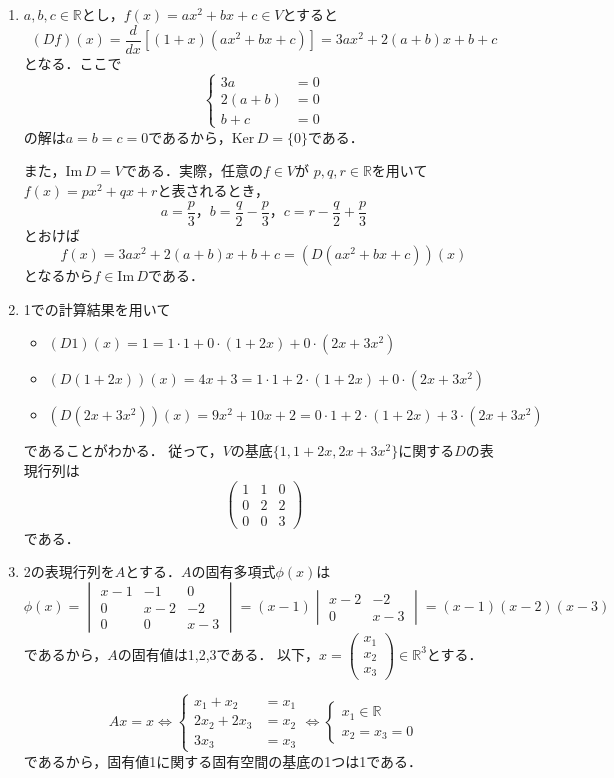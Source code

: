 \documentclass{jsarticle}
\theoremstyle{definition}
\begin{document}
\begin{enumerate}
\item$a,b,c\in\mathbb{R}$とし，$f(x)=ax^2+bx+c\in V$とすると
\[ (Df)(x)=\frac{d}{dx}[(1+x)(ax^2+bx+c)]=3ax^2+2(a+b)x+b+c \]
となる．ここで
\[ \begin{cases}3a&=0 \\ 2(a+b)&=0 \\ b+c&=0\end{cases} \]
の解は$a=b=c=0$であるから，$\mathrm{Ker}\,D=\{0\}$である．

また，$\mathrm{Im}\,D=V$である．実際，任意の$f\in V$が
$p,q,r\in\mathbb{R}$を用いて$f(x)=px^2+qx+r$と表されるとき，
\[ a=\frac{p}{3}，b=\frac{q}{2}-\frac{p}{3}，c=r-\frac{q}{2}+\frac{p}{3} \]
とおけば
\[ f(x)=3ax^2+2(a+b)x+b+c=(D(ax^2+bx+c))(x) \]
となるから$f\in\mathrm{Im}\,D$である．

\item1での計算結果を用いて
\begin{itemize}
\item$(D1)(x)=1=1\cdot1+0\cdot(1+2x)+0\cdot(2x+3x^2)$
\item$(D(1+2x))(x)=4x+3=1\cdot1+2\cdot(1+2x)+0\cdot(2x+3x^2)$
\item$(D(2x+3x^2))(x)=9x^2+10x+2=0\cdot1+2\cdot(1+2x)+3\cdot(2x+3x^2)$
\end{itemize}
であることがわかる．
従って，$V$の基底$\{1,1+2x,2x+3x^2\}$に関する$D$の表現行列は
\[ \begin{pmatrix}1&1&0 \\ 0&2&2 \\ 0&0&3\end{pmatrix} \]
である．

\item2の表現行列を$A$とする．$A$の固有多項式$\phi(x)$は
\[ \phi(x)
=\begin{vmatrix}x-1&-1&0 \\ 0&x-2&-2 \\ 0&0&x-3\end{vmatrix}
=(x-1)\begin{vmatrix}x-2&-2 \\ 0&x-3\end{vmatrix}
=(x-1)(x-2)(x-3) \]
であるから，$A$の固有値は1,2,3である．
以下，$x=\begin{pmatrix}x_1 \\ x_2 \\ x_3\end{pmatrix}\in\mathbb{R}^3$とする．

\[ Ax=x\Leftrightarrow
\begin{cases}x_1+x_2&=x_1 \\ 2x_2+2x_3&=x_2 \\ 3x_3&=x_3\end{cases}
\Leftrightarrow\begin{cases}x_1\in\mathbb{R} \\ x_2=x_3=0\end{cases} \]
であるから，固有値1に関する固有空間の基底の1つは1である．


\end{enumerate}
\end{document}

